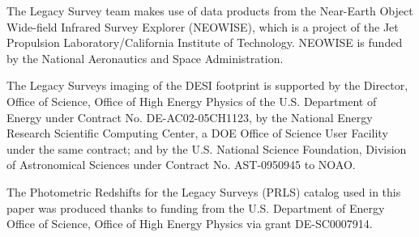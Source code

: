 \documentclass[twocolumn,apj,iop,tighten]{emulateapj2}
\begin{document}
The Legacy Survey team makes use of data products from the Near-Earth Object Wide-field Infrared Survey Explorer (NEOWISE), which is a project of the Jet Propulsion Laboratory/California Institute of Technology. NEOWISE is funded by the National Aeronautics and Space Administration.

The Legacy Surveys imaging of the DESI footprint is supported by the Director, Office of Science, Office of High Energy Physics of the U.S. Department of Energy under Contract No. DE-AC02-05CH1123, by the National Energy Research Scientific Computing Center, a DOE Office of Science User Facility under the same contract; and by the U.S. National Science Foundation, Division of Astronomical Sciences under Contract No. AST-0950945 to NOAO.

The Photometric Redshifts for the Legacy Surveys (PRLS) catalog used in this paper was produced thanks to funding from the U.S. Department of Energy Office of Science, Office of High Energy Physics via grant DE-SC0007914.


\end{document}
